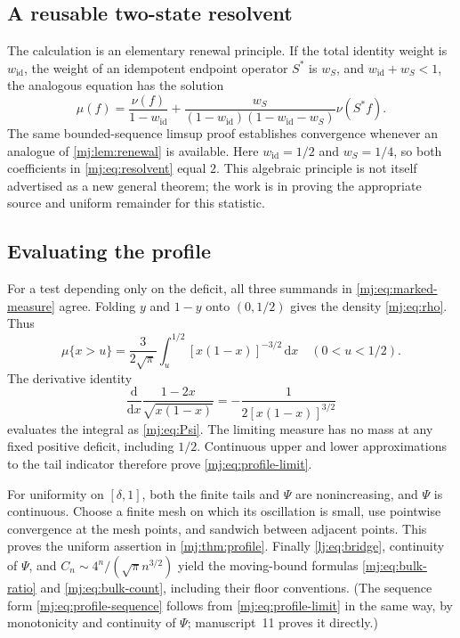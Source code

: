 \documentclass[11pt,a4paper]{article}
\theoremstyle{definition}\newaliascnt{definition}{theorem}
\theoremstyle{remark}\newaliascnt{remark}{theorem}
\newcommand{\dd}{\mathrm d}
\begin{document}
\subsection{A reusable two-state resolvent}
The calculation is an elementary renewal principle. If the total identity
weight is $w_{\mathrm{id}}$, the weight of an idempotent endpoint operator
$S^\ast$ is $w_S$, and $w_{\mathrm{id}}+w_S<1$, the analogous equation has
the solution
\begin{equation}
 \mu(f)=\frac{\nu(f)}{1-w_{\mathrm{id}}}
       +\frac{w_S}{(1-w_{\mathrm{id}})(1-w_{\mathrm{id}}-w_S)}\nu(S^\ast f).
 \label{mj:eq:general-resolvent}
\end{equation}
The same bounded-sequence limsup proof establishes convergence whenever an
analogue of \cref{mj:lem:renewal} is available. Here $w_{\mathrm{id}}=1/2$
and $w_S=1/4$, so both coefficients in \eqref{mj:eq:resolvent} equal $2$.
This algebraic principle is not itself advertised as a new general theorem;
the work is in proving the appropriate source and uniform remainder for this
statistic.

\subsection{Evaluating the profile}
\label{mj:sec:profile-proof}
For a test depending only on the deficit, all three summands in
\eqref{mj:eq:marked-measure} agree. Folding $y$ and $1-y$ onto $(0,1/2)$
gives the density \eqref{mj:eq:rho}. Thus
\begin{equation}
 \mu\{x>u\}=\frac3{2\sqrt\pi}\int_u^{1/2}
          [x(1-x)]^{-3/2}\,\dd x
 \quad(0<u<1/2).
 \label{mj:eq:tail-integral}
\end{equation}
The derivative identity
\begin{equation}
 \frac{\dd}{\dd x}
 \frac{1-2x}{\sqrt{x(1-x)}}
 =-\frac1{2[x(1-x)]^{3/2}}
 \label{mj:eq:derivative}
\end{equation}
evaluates the integral as \eqref{mj:eq:Psi}. The limiting measure has no
mass at any fixed positive deficit, including $1/2$. Continuous upper and
lower approximations to the tail indicator therefore prove
\eqref{mj:eq:profile-limit}.

For uniformity on $[\delta,1]$, both the finite tails and $\Psi$ are
nonincreasing, and $\Psi$ is continuous. Choose a finite mesh on which its
oscillation is small, use pointwise convergence at the mesh points, and
sandwich between adjacent points. This proves the uniform assertion in
\cref{mj:thm:profile}. Finally \eqref{lj:eq:bridge}, continuity of $\Psi$,
and $C_n\sim4^n/(\sqrt\pi n^{3/2})$ yield the moving-bound formulas
\eqref{mj:eq:bulk-ratio} and \eqref{mj:eq:bulk-count}, including their floor
conventions. (The sequence form \eqref{mj:eq:profile-sequence} follows from
\eqref{mj:eq:profile-limit} in the same way, by monotonicity and continuity
of $\Psi$; manuscript~11 proves it directly.)
\end{document}
